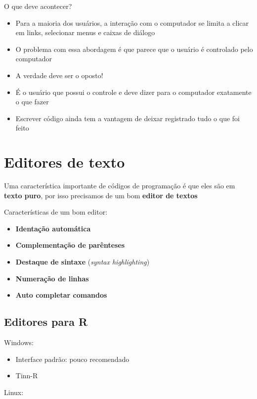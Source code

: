 \documentclass[10pt,a4paper]{book}
\providecommand{\tightlist}{%
  \setlength{\itemsep}{0pt}\setlength{\parskip}{0pt}}
\begin{document}
O que deve acontecer?

\begin{itemize}
\tightlist
\item
  Para a maioria dos usuários, a interação com o computador se limita a
  clicar em links, selecionar menus e caixas de diálogo
\item
  O problema com essa abordagem é que parece que o usuário é controlado
  pelo computador
\item
  A verdade deve ser o oposto!
\item
  É o usuário que possui o controle e deve dizer para o computador
  exatamente o que fazer
\item
  Escrever código ainda tem a vantagem de deixar registrado tudo o que
  foi feito
\end{itemize}

\section{Editores de texto}\label{editores-de-texto}

Uma característica importante de códigos de programação é que eles são
em \textbf{texto puro}, por isso precisamos de um bom \textbf{editor de
textos}

Características de um bom editor:

\begin{itemize}
\tightlist
\item
  \textbf{Identação automática}
\item
  \textbf{Complementação de parênteses}
\item
  \textbf{Destaque de sintaxe} (\emph{syntax highlighting})
\item
  \textbf{Numeração de linhas}
\item
  \textbf{Auto completar comandos}
\end{itemize}

\subsection{Editores para R}\label{editores-para-r}

Windows:

\begin{itemize}
\tightlist
\item
  Interface padrão: pouco recomendado
\item
  Tinn-R
\end{itemize}

Linux:
\end{document}
